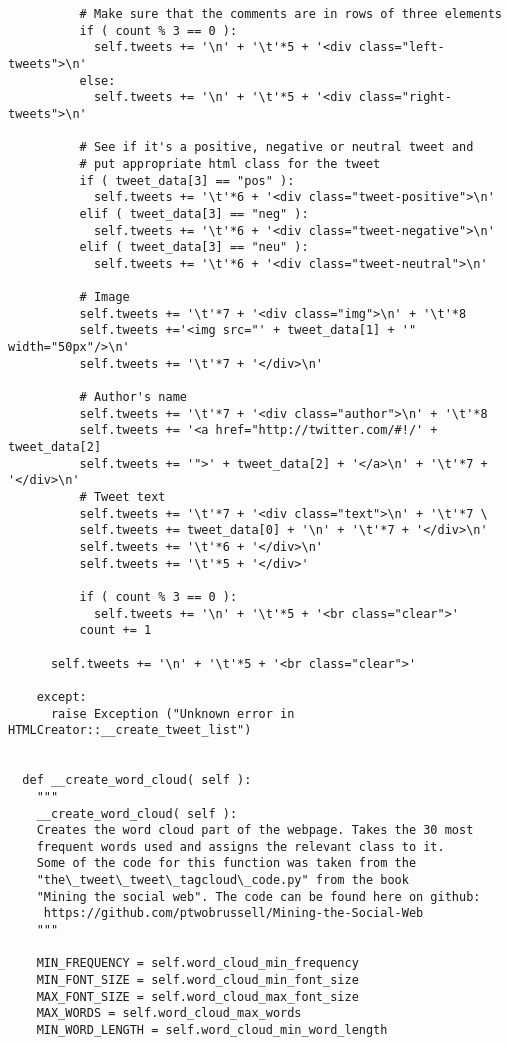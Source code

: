 \begin{verbatim}
          # Make sure that the comments are in rows of three elements
          if ( count % 3 == 0 ):
            self.tweets += '\n' + '\t'*5 + '<div class="left-tweets">\n'
          else:
            self.tweets += '\n' + '\t'*5 + '<div class="right-tweets">\n'
          
          # See if it's a positive, negative or neutral tweet and 
          # put appropriate html class for the tweet
          if ( tweet_data[3] == "pos" ):
            self.tweets += '\t'*6 + '<div class="tweet-positive">\n'
          elif ( tweet_data[3] == "neg" ):
            self.tweets += '\t'*6 + '<div class="tweet-negative">\n'
          elif ( tweet_data[3] == "neu" ):
            self.tweets += '\t'*6 + '<div class="tweet-neutral">\n'
          
          # Image
          self.tweets += '\t'*7 + '<div class="img">\n' + '\t'*8
          self.tweets +='<img src="' + tweet_data[1] + '" width="50px"/>\n'
          self.tweets += '\t'*7 + '</div>\n'
          
          # Author's name
          self.tweets += '\t'*7 + '<div class="author">\n' + '\t'*8 
          self.tweets += '<a href="http://twitter.com/#!/' + tweet_data[2]
          self.tweets += '">' + tweet_data[2] + '</a>\n' + '\t'*7 + '</div>\n' 
          # Tweet text
          self.tweets += '\t'*7 + '<div class="text">\n' + '\t'*7 \
          self.tweets += tweet_data[0] + '\n' + '\t'*7 + '</div>\n' 
          self.tweets += '\t'*6 + '</div>\n'
          self.tweets += '\t'*5 + '</div>'
          
          if ( count % 3 == 0 ):
            self.tweets += '\n' + '\t'*5 + '<br class="clear">'
          count += 1

      self.tweets += '\n' + '\t'*5 + '<br class="clear">'

    except:
      raise Exception ("Unknown error in HTMLCreator::__create_tweet_list")


  def __create_word_cloud( self ):
    """
    __create_word_cloud( self ):
    Creates the word cloud part of the webpage. Takes the 30 most
    frequent words used and assigns the relevant class to it.
    Some of the code for this function was taken from the
    "the\_tweet\_tweet\_tagcloud\_code.py" from the book 
    "Mining the social web". The code can be found here on github:
     https://github.com/ptwobrussell/Mining-the-Social-Web
    """

    MIN_FREQUENCY = self.word_cloud_min_frequency
    MIN_FONT_SIZE = self.word_cloud_min_font_size
    MAX_FONT_SIZE = self.word_cloud_max_font_size
    MAX_WORDS = self.word_cloud_max_words
    MIN_WORD_LENGTH = self.word_cloud_min_word_length


\end{verbatim}
